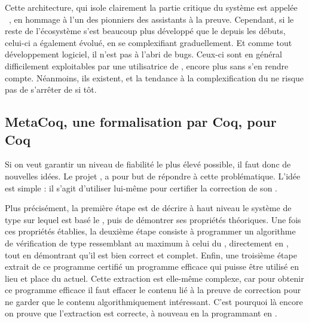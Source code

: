 Cette architecture, qui isole clairement la partie critique du système
est appelée ~, en 
hommage à l’un des pionniers des assistants à la preuve.
Cependant, si le reste de l’écosystème s’est beaucoup plus développé que le  depuis les débuts, celui-ci a également évolué, en se complexifiant graduellement.
Et comme tout développement logiciel, il n’est pas à l’abri de bugs.
Ceux-ci sont en général difficilement exploitables par une utilisatrice de , encore plus sans s’en rendre compte.
Néanmoins, ils existent, et la tendance à la complexification du  ne risque pas de s’arrêter de si tôt.

\subsection{MetaCoq, une formalisation par Coq, pour Coq}
\label{sec:intro-metacoq}


Si on veut garantir un niveau de fiabilité le plus élevé possible, il faut donc de nouvelles idées.
Le projet , a pour but de répondre à cette problématique.
L’idée est simple : il s’agit d’utiliser  lui-même pour certifier la correction de son .

Plus précisément, la première étape est de décrire à haut niveau le système de type sur lequel est basé le , puis de démontrer ses propriétés théoriques.
Une fois ces propriétés établies, la deuxième étape consiste à programmer un algorithme de vérification de type ressemblant au maximum à celui du , directement en ,
tout en démontrant qu’il est bien correct
et complet.
Enfin, une troisième étape extrait de ce programme  certifié
un programme efficace qui puisse être utilisé en lieu et place du  actuel.
Cette extraction est elle-même complexe, car pour obtenir ce programme efficace il
faut effacer le contenu lié à la preuve de correction
pour ne garder que le contenu algorithmiquement intéressant.
C’est pourquoi là encore on prouve que l’extraction est correcte,
à nouveau en la programmant en .

